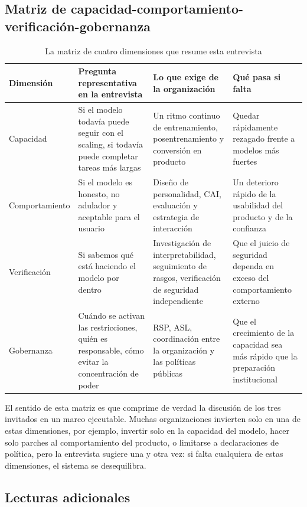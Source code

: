 \subsection{Matriz de capacidad-comportamiento-verificación-gobernanza}

\begin{table}[H]
\centering
\begin{tabular}{p{} p{} p{} p{}}
\toprule
Dimensión & Pregunta representativa en la entrevista & Lo que exige de la organización & Qué pasa si falta \\
\midrule
Capacidad & Si el modelo todavía puede seguir con el scaling, si todavía puede completar tareas más largas & Un ritmo continuo de entrenamiento, posentrenamiento y conversión en producto & Quedar rápidamente rezagado frente a modelos más fuertes \\
Comportamiento & Si el modelo es honesto, no adulador y aceptable para el usuario & Diseño de personalidad, CAI, evaluación y estrategia de interacción & Un deterioro rápido de la usabilidad del producto y de la confianza \\
Verificación & Si sabemos qué está haciendo el modelo por dentro & Investigación de interpretabilidad, seguimiento de rasgos, verificación de seguridad independiente & Que el juicio de seguridad dependa en exceso del comportamiento externo \\
Gobernanza & Cuándo se activan las restricciones, quién es responsable, cómo evitar la concentración de poder & RSP, ASL, coordinación entre la organización y las políticas públicas & Que el crecimiento de la capacidad sea más rápido que la preparación institucional \\
\bottomrule
\end{tabular}
\caption{La matriz de cuatro dimensiones que resume esta entrevista}
\end{table}

El sentido de esta matriz es que comprime de verdad la discusión de los tres invitados en un marco ejecutable. Muchas organizaciones invierten solo en una de estas dimensiones, por ejemplo, invertir solo en la capacidad del modelo, hacer solo parches al comportamiento del producto, o limitarse a declaraciones de política, pero la entrevista sugiere una y otra vez: si falta cualquiera de estas dimensiones, el sistema se desequilibra.

\subsection{Lecturas adicionales}

